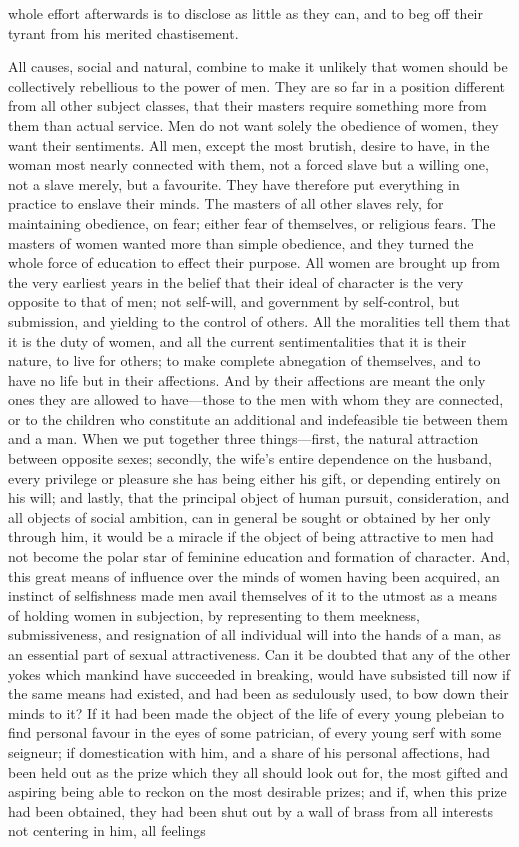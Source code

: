 \documentclass[12pt]{report}
\begin{document}
whole effort afterwards is to disclose as little as they can, and to beg off their tyrant from his merited chastisement.

All causes, social and natural, combine to make it unlikely that women should be collectively rebellious to the power of men. They are so far in a position different from all other subject classes, that their masters require something more from them than actual service. Men do not want solely the obedience of women, they want their sentiments. All men, except the most brutish, desire to have, in the woman most nearly connected with them, not a forced slave but a willing one, not a slave merely, but a favourite. They have therefore put everything in practice to enslave their minds. The masters of all other slaves rely, for maintaining obedience, on fear; either fear of themselves, or religious fears. The masters of women wanted more than simple obedience, and they turned the whole force of education to effect their purpose. All women are brought up from the very earliest years in the belief that their ideal of character is the very opposite to that of men; not self-will, and government by self-control, but submission, and yielding to the control of others. All the moralities tell them that it is the duty of women, and all the current sentimentalities that it is their nature, to live for others; to make complete abnegation of themselves, and to have no life but in their affections. And by their affections are meant the only ones they are allowed to have—those to the men with whom they are connected, or to the children who constitute an additional and indefeasible tie between them and a man. When we put together three things—first, the natural attraction between opposite sexes; secondly, the wife's entire dependence on the husband, every privilege or pleasure she has being either his gift, or depending entirely on his will; and lastly, that the principal object of human pursuit, consideration, and all objects of social ambition, can in general be sought or obtained by her only through him, it would be a miracle if the object of being attractive to men had not become the polar star of feminine education and formation of character. And, this great means of influence over the minds of women having been acquired, an instinct of selfishness made men avail themselves of it to the utmost as a means of holding women in subjection, by representing to them meekness, submissiveness, and resignation of all individual will into the hands of a man, as an essential part of sexual attractiveness. Can it be doubted that any of the other yokes which mankind have succeeded in breaking, would have subsisted till now if the same means had existed, and had been as sedulously used, to bow down their minds to it? If it had been made the object of the life of every young plebeian to find personal favour in the eyes of some patrician, of every young serf with some seigneur; if domestication with him, and a share of his personal affections, had been held out as the prize which they all should look out for, the most gifted and aspiring being able to reckon on the most desirable prizes; and if, when this prize had been obtained, they had been shut out by a wall of brass from all interests not centering in him, all feelings 
\end{document}
